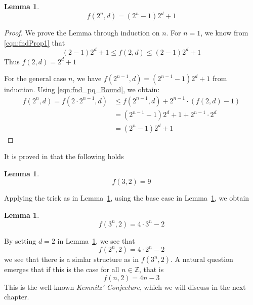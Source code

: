 \documentclass{article}
\theoremstyle{definition}
\newtheorem{lemma}[theorem]{Lemma}
\numberwithin{equation}{theorem}
\numberwithin{figure}{theorem}
\newcommand{\kemnitzConjecture}{\emph{Kemnitz' Conjecture}}
\newcommand{\Integer}{\ensuremath{\mathbb{Z}}}
\newcommand{\fnd}[2]{\ensuremath{f(#1,#2)}}
\begin{document}
    \begin{lemma}\label{lem:f_nd_2_potent}
        \begin{equation*}
            \fnd{2^n}{d} = (2^n - 1) 2^d + 1
        \end{equation*}
    \end{lemma}
    \begin{proof}
        We prove the Lemma through induction on $n$.
        For $n = 1$, we know from \eqref{eqn:fndProp1} that
        \begin{equation*}
            (2 - 1)2^d + 1 \leq \fnd{2}{d} \leq (2 - 1)2^d + 1
        \end{equation*}
        Thus $\fnd{2}{d} = 2^d + 1$

        For the general case $n$, we have $f(2^{n-1},d) = (2^{n-1} - 1)2^d + 1$ from induction.
        Using \eqref{eqn:fnd_pq_Bound}, we obtain:
        \begin{align*}
            \fnd{2^n}{d} = \fnd{2 \cdot 2^{n-1}}{d} &\leq \fnd{2^{n-1}}{d} + 2^{n-1} \cdot (\fnd{2}{d} - 1)\\
            &= (2^{n-1} - 1)2^d + 1 + 2^{n-1} \cdot 2^d\\
            &= (2^n - 1) 2^d + 1
        \end{align*}
    \end{proof}
    It is proved in \cite{Harborth1973} that the following holds
    \begin{lemma}\label{lem:f_3_2_Value_Harborth}
        \begin{equation*}
            \fnd{3}{2} = 9
        \end{equation*}
    \end{lemma}
    Applying the trick as in Lemma~\ref{lem:f_nd_2_potent}, using the base case in Lemma~\ref{lem:f_3_2_Value_Harborth}, we obtain 
    \begin{lemma}\label{lem:f_3Potent_2_value}
        \begin{equation*}
            \fnd{3^n}{2} = 4 \cdot 3^n - 2
        \end{equation*}
    \end{lemma}

    By setting $d = 2$ in Lemma~\ref{lem:f_nd_2_potent}, we see that
    \[\fnd{2^n}{2} = 4 \cdot 2^n - 2\]
    we see that there is a simlar structure as in $\fnd{3^n}{2}$. 
    A natural question emerges that if this is the case for all $n \in \Integer$, that is
    \[\fnd{n}{2} = 4n - 3\]
    This is the well-known \kemnitzConjecture{}, which we will discuss in the next chapter.
\newpage
\end{document}
